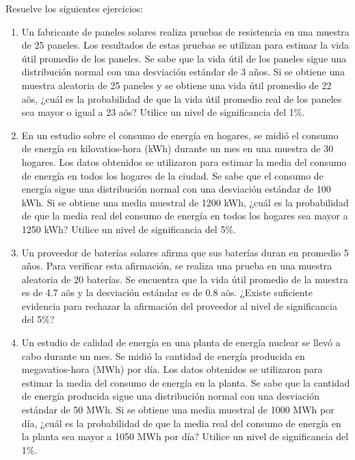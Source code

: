 \begin{Ejer}
Resuelve los siguientes ejercicios:
\begin{enumerate}

\item Un fabricante de paneles solares realiza pruebas de resistencia en una muestra de 25 paneles. Los resultados de estas pruebas se utilizan para estimar la vida \'util promedio de los paneles. Se sabe que la vida \'util de los paneles sigue una distribuci\'on normal con una desviaci\'on est\'andar de 3 a\~nos. Si se obtiene una muestra aleatoria de 25 paneles y se obtiene una vida \'util promedio de 22 a\~os, ¿cu\'al es la probabilidad de que la vida \'util promedio real de los paneles sea mayor o igual a 23 a\~os? Utilice un nivel de significancia del 1\%.

\item En un estudio sobre el consumo de energ\'ia en hogares, se midi\'o el consumo de energ\'ia en kilovatios-hora (kWh) durante un mes en una muestra de 30 hogares. Los datos obtenidos se utilizaron para estimar la media del consumo de energ\'ia en todos los hogares de la ciudad. Se sabe que el consumo de energ\'ia sigue una distribuci\'on normal con una desviaci\'on est\'andar de 100 kWh. Si se obtiene una media muestral de 1200 kWh, ¿cu\'al es la probabilidad de que la media real del consumo de energ\'ia en todos los hogares sea mayor a 1250 kWh? Utilice un nivel de significancia del 5\%.

\item Un proveedor de bater\'ias solares afirma que sus bater\'ias duran en promedio 5 a\~nos. Para verificar esta afirmaci\'on, se realiza una prueba en una muestra aleatoria de 20 bater\'ias. Se encuentra que la vida \'util promedio de la muestra es de 4.7 a\~os y la desviaci\'on est\'andar es de 0.8 a\~os. ¿Existe suficiente evidencia para rechazar la afirmaci\'on del proveedor al nivel de significancia del 5\%?

\item Un estudio de calidad de energ\'ia en una planta de energ\'ia nuclear se llev\'o a cabo durante un mes. Se midi\'o la cantidad de energ\'ia producida en megavatios-hora (MWh) por d\'ia. Los datos obtenidos se utilizaron para estimar la media del consumo de energ\'ia en la planta. Se sabe que la cantidad de energ\'ia producida sigue una distribuci\'on normal con una desviaci\'on est\'andar de 50 MWh. Si se obtiene una media muestral de 1000 MWh por d\'ia, ¿cu\'al es la probabilidad de que la media real del consumo de energ\'ia en la planta sea mayor a 1050 MWh por d\'ia? Utilice un nivel de significancia del 1\%.


\end{enumerate}
\end{Ejer}
